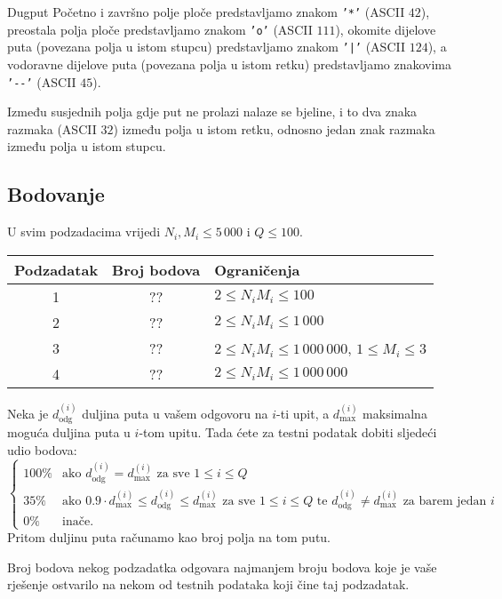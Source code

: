 \begin{statement}[
  problempoints=100,
  timelimit=1 sekunda,
  memorylimit=512 MiB,
]{Dugput}
Početno i završno polje ploče predstavljamo znakom \texttt{'*'} (ASCII $42$),
preostala polja ploče predstavljamo znakom \texttt{'o'} (ASCII $111$),
okomite dijelove puta (povezana polja u istom stupcu) predstavljamo znakom
\texttt{'|'} (ASCII $124$), a vodoravne dijelove puta (povezana polja u istom
retku) predstavljamo znakovima \texttt{'-{}-'} (ASCII $45$).

Između susjednih polja gdje put ne prolazi nalaze se bjeline, i to dva znaka
razmaka (ASCII $32$) između polja u istom retku, odnosno jedan znak razmaka
između polja u istom stupcu.

\subsection*{Bodovanje}
U svim podzadacima vrijedi $N_i, M_i \leq 5\,000$ i $Q \leq 100$.

{\renewcommand{\arraystretch}{1.4}
  \setlength{\tabcolsep}{6pt}
  \begin{tabular}{ccl}
 Podzadatak & Broj bodova & Ograničenja \\ \midrule
  1 & ?? & $2 \leq N_i M_i \leq 100$ \\
  2 & ?? & $2 \leq N_i M_i \leq 1\,000$ \\
  3 & ?? & $2 \leq N_i M_i \leq 1\,000\,000$, $1 \leq M_i \leq 3$ \\
  4 & ?? & $2 \leq N_i M_i \leq 1\,000\,000$ \\
\end{tabular}}

Neka je $d_\mathrm{odg}^{(i)}$ duljina puta u vašem odgovoru na $i$-ti upit, a $d_\mathrm{max}^{(i)}$ maksimalna moguća duljina puta u $i$-tom upitu. 
Tada ćete za testni podatak dobiti sljedeći udio bodova:
$$
\begin{cases}
    100\% & \text{ako $d_\mathrm{odg}^{(i)} = d_\mathrm{max}^{(i)}$ za sve $1 \leq i \leq Q$} \\
    35\% & \text{ako $0.9 \cdot d_\mathrm{max}^{(i)} \leq d_\mathrm{odg}^{(i)} \leq d_\mathrm{max}^{(i)}$ za sve $1 \leq i \leq Q$ te $d_\mathrm{odg}^{(i)} \neq d_\mathrm{max}^{(i)}$ za barem jedan $i$} \\
    0\% & \text{inače.}
\end{cases}
$$
Pritom duljinu puta računamo kao broj polja na tom putu.

Broj bodova nekog podzadatka odgovara najmanjem broju
bodova koje je vaše rješenje ostvarilo na nekom od testnih podataka koji čine
taj podzadatak.


\end{statement}
